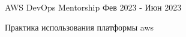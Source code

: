 

\begin{cventries}



    \cventry
    {} %
    {AWS DevOps Mentorship} %
    {} %
    {Фев 2023 - Июн 2023} %
    {
      \begin{cvitems} %
          Практика использования платформы aws
      \end{cvitems}
    }


\end{cventries}
